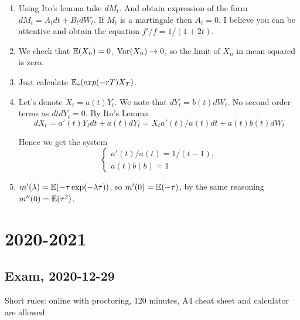 \documentclass[12pt, a4paper]{article}
\begin{document}
\begin{enumerate}
\item Using Ito's lemma take $dM_t$. And obtain expression of the form $dM_t = A_t dt + B_t dW_t$.
If $M_t$ is a martingale then $A_t = 0$. I believe you can be attentive and obtain the equation $f'/f = 1/(1+2t)$. 
\item We check that $\operatorname{\mathbb{E}}(X_n) = 0$, $\operatorname{Var}(X_n) \rightarrow 0$, so the limit of $X_n$ in mean squared is zero.
\item Just calculate $\operatorname{\mathbb{E}}_*(exp(-rT)X_T)$.
\item Let's denote $X_t = a(t) Y_t$. We note that $dY_t = b(t) dW_t$. No second order terms as $dt dY_t = 0$.  
By Ito's Lemma 
\[
  dX_t = a'(t) Y_t dt + a(t) dY_t = 
  X_t a'(t)/a(t) dt + a(t) b(t) dW_t
\]

Hence we get the system
\[
\begin{cases}
  a'(t)/a(t) = 1/(t-1), \\
  a(t) b(b) =1
\end{cases}
\]



\item $m'(\lambda) = \operatorname{\mathbb{E}}(-\tau \exp(-\lambda \tau))$, so $m'(0)= \operatorname{\mathbb{E}}(-\tau)$, by the same reasoning $m''(0)=\operatorname{\mathbb{E}}(\tau^2)$.
\end{enumerate}




\section{2020-2021}


\subsection{Exam, 2020-12-29}

Short rules: online with proctoring, 120 minutes, A4 cheat sheet and calculator are allowed.
\end{document}

